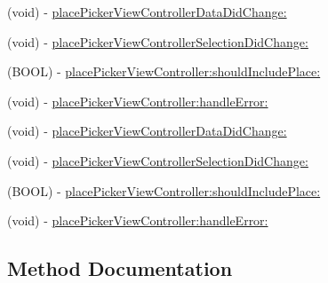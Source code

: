 \begin{DoxyCompactItemize}
\item 
(void) -\/ \hyperlink{protocolFBPlacePickerDelegate_01-p_aaa234bae2ec98cf414ef201da6264c67}{place\+Picker\+View\+Controller\+Data\+Did\+Change\+:}
\item 
(void) -\/ \hyperlink{protocolFBPlacePickerDelegate_01-p_a45f5c05ae6b3d030c4350562954964db}{place\+Picker\+View\+Controller\+Selection\+Did\+Change\+:}
\item 
(B\+O\+OL) -\/ \hyperlink{protocolFBPlacePickerDelegate_01-p_a619f252e10abcf1c95a99de98181bc41}{place\+Picker\+View\+Controller\+:should\+Include\+Place\+:}
\item 
(void) -\/ \hyperlink{protocolFBPlacePickerDelegate_01-p_a5a050442be2188ad3b2b04aa977577a4}{place\+Picker\+View\+Controller\+:handle\+Error\+:}
\item 
(void) -\/ \hyperlink{protocolFBPlacePickerDelegate_01-p_aaa234bae2ec98cf414ef201da6264c67}{place\+Picker\+View\+Controller\+Data\+Did\+Change\+:}
\item 
(void) -\/ \hyperlink{protocolFBPlacePickerDelegate_01-p_a45f5c05ae6b3d030c4350562954964db}{place\+Picker\+View\+Controller\+Selection\+Did\+Change\+:}
\item 
(B\+O\+OL) -\/ \hyperlink{protocolFBPlacePickerDelegate_01-p_a619f252e10abcf1c95a99de98181bc41}{place\+Picker\+View\+Controller\+:should\+Include\+Place\+:}
\item 
(void) -\/ \hyperlink{protocolFBPlacePickerDelegate_01-p_a5a050442be2188ad3b2b04aa977577a4}{place\+Picker\+View\+Controller\+:handle\+Error\+:}
\end{DoxyCompactItemize}


\subsection{Method Documentation}
\mbox{\label{protocolFBPlacePickerDelegate_01-p_a5a050442be2188ad3b2b04aa977577a4}} 
